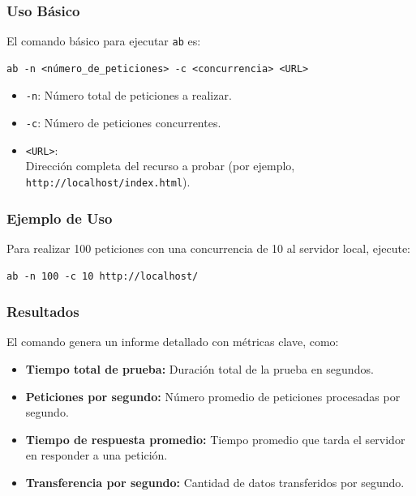 \subsubsection{Uso Básico}

El comando básico para ejecutar \texttt{ab} es:

\begin{lstlisting}[style=customstyle]
ab -n <número_de_peticiones> -c <concurrencia> <URL>
\end{lstlisting}

\begin{itemize}
    \item \texttt{-n}: Número total de peticiones a realizar.
    \item \texttt{-c}: Número de peticiones concurrentes.
    \item \texttt{<URL>}: \\
    Dirección completa del recurso a probar (por ejemplo, \texttt{http://localhost/index.html}).
\end{itemize}

\subsubsection{Ejemplo de Uso}

Para realizar 100 peticiones con una concurrencia de 10 al servidor local, ejecute:

\begin{lstlisting}[style=customstyle]
ab -n 100 -c 10 http://localhost/
\end{lstlisting}

\subsubsection{Resultados}

El comando genera un informe detallado con métricas clave, como:

\begin{itemize}
    \item \textbf{Tiempo total de prueba:} Duración total de la prueba en segundos.
    \item \textbf{Peticiones por segundo:} Número promedio de peticiones procesadas por segundo.
    \item \textbf{Tiempo de respuesta promedio:} Tiempo promedio que tarda el servidor en responder a una petición.
    \item \textbf{Transferencia por segundo:} Cantidad de datos transferidos por segundo.
\end{itemize}

